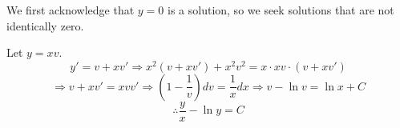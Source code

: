 \item

We first acknowledge that $y=0$ is a solution, so we seek solutions that are not identically zero.

Let $y = xv$.
\[
	y' = v + xv'
	\Rightarrow x^2 (v + xv') + x^2 v^2 = x \cdot xv \cdot (v + xv')
\]
\[
	\Rightarrow v + xv' = xvv'
	\Rightarrow \left( 1 - \frac{1}{v} \right) dv = \frac{1}{x} dx
	\Rightarrow v - \ln v = \ln x + C
\]
\[
	\therefore \frac{y}{x} - \ln y = C
\]
